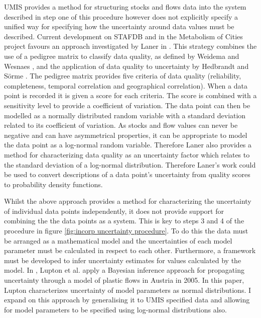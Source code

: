 \documentclass[ %
                    author={Tom Jager},
                supervisor={Dr. Daniel Schien},
                    degree={MEng},
                     title={A Bayesian Inference Engine for UMIS Structured Data},
                  subtitle={},
                      type={research},
                      year={2019} ]{dissertation}
\begin{document}

UMIS provides a method for structuring stocks and flows data into the system described in step one of this procedure however does not explicitly specify a unified way for specifying how the uncertainty around data values must be described. Current development on STAFDB and in the Metabolism of Cities project favours an approach investigated by Laner in \cite{laner2016novel}. This strategy combines the use of a pedigree matrix to classify data quality, as defined by Weidema and Wesnaes \cite{weidema1996data}, and the application of data quality to uncertainty by Hedbrandt and S\"orme \cite{hedbrant2001data}. The pedigree matrix provides five criteria of data quality (reliability, completeness, temporal correlation and geographical correlation). When a data point is recorded it is given a score for each criteria. The score is combined with a sensitivity level to provide a coefficient of variation. The data point can then be modelled as a normally distributed random variable with a standard deviation related to its coefficient of variation. As stocks and flow values can never be negative and can have asymmetrical properties, it can be appropriate to model the data point as a log-normal random variable. Therefore Laner also provides a method for characterizing data quality as an uncertainty factor which relates to the standard deviation of a log-normal distribution. Therefore Laner's work could be used to convert descriptions of a data point's uncertainty from quality scores to probability density functions.

Whilst the above approach provides a method for characterizing the uncertainty of individual data points independently, it does not provide support for combining the the data points as a system. This is key to steps 3 and 4 of the procedure in figure \ref{fig:incorp uncertainty procedure}. To do this the data must be arranged as a mathematical model and the uncertainties of each model parameter must be calculated in respect to each other. Furthermore, a framework must be developed to infer uncertainty estimates for values calculated by the model. In \cite{lupton2018incremental}, Lupton et al. apply a Bayesian inference approach for propagating uncertainty through a model of plastic flows in Austria in 2005. In this paper, Lupton characterizes uncertainty of model parameters as normal distributions. I expand on this approach by generalising it to UMIS specified data and allowing for model parameters to be specified using log-normal distributions also.
\end{document}
